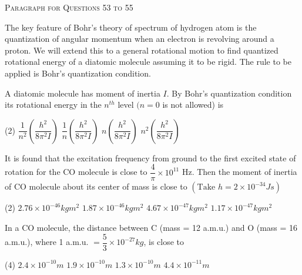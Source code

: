 
\begin{center}
    \textsc{Paragraph for Questions 53 to 55}
\end{center}

The key feature of Bohr's theory of spectrum of hydrogen atom is the quantization of angular momentum when an electron is revolving around a proton. We will extend this to a general rotational motion to find quantized rotational energy of a diatomic molecule assuming it to be rigid. The rule to be applied is Bohr's quantization condition.

\item A diatomic molecule has moment of inertia \( I \). By Bohr's quantization condition its rotational energy in the \( n^{th} \) level \( (n = 0 \) is not allowed) is
    \begin{tasks}(2)
        \task \(\dfrac{1}{n^2}\left(\dfrac{h^2}{8\pi^2 I}\right)\)
        \task \(\dfrac{1}{n}\left(\dfrac{h^2}{8\pi^2 I}\right)\)
        \task \(n\left(\dfrac{h^2}{8\pi^2 I}\right)\)
        \task \(n^2\left(\dfrac{h^2}{8\pi^2 I}\right)\)\ans
    \end{tasks}

\item It is found that the excitation frequency from ground to the first excited state of rotation for the CO molecule is close to \( \dfrac{4}{\pi} \times 10^{11} \) Hz. Then the moment of inertia of CO molecule about its center of mass is close to \( \left(\text{Take } h = 2 \times 10^{-34} J s\right) \)
    \begin{tasks}(2)
        \task \(2.76 \times 10^{-46} kg m^2\)
        \task \(1.87 \times 10^{-46} kg m^2\)\ans
        \task \(4.67 \times 10^{-47} kg m^2\)
        \task \(1.17 \times 10^{-47} kg m^2\)
    \end{tasks}

\item In a CO molecule, the distance between C (mass = 12 a.m.u.) and O (mass = 16 a.m.u.), where 1 a.m.u. \( = \dfrac{5}{3} \times 10^{-27} kg \), is close to
    \begin{tasks}(4)
        \task \(2.4 \times 10^{-10} m\)
        \task \(1.9 \times 10^{-10} m\)
        \task \(1.3 \times 10^{-10} m\)\ans
        \task \(4.4 \times 10^{-11} m\)
    \end{tasks}
